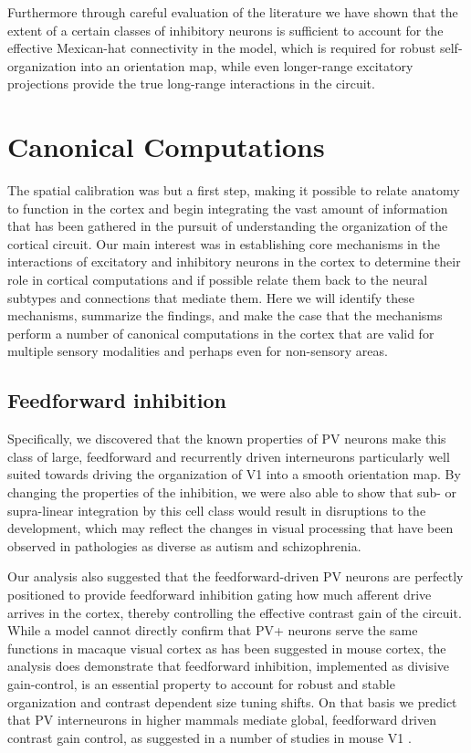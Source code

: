 Furthermore through careful evaluation of the literature we have shown
that the extent of a certain classes of inhibitory neurons is
sufficient to account for the effective Mexican-hat connectivity in
the model, which is required for robust self-organization into an
orientation map, while even longer-range excitatory projections
provide the true long-range interactions in the circuit.

\section{Canonical Computations}

The spatial calibration was but a first step, making it
possible to relate anatomy to function in the cortex and begin
integrating the vast amount of information that has been gathered in
the pursuit of understanding the organization of the cortical
circuit. Our main interest was in establishing core mechanisms in the
interactions of excitatory and inhibitory neurons in the cortex to
determine their role in cortical computations and if possible relate
them back to the neural subtypes and connections that mediate
them. Here we will identify these mechanisms, summarize the findings,
and make the case that the mechanisms perform a number of canonical computations
in the cortex that are valid for multiple sensory modalities and perhaps even
for non-sensory areas.

\subsection{Feedforward inhibition}

Specifically, we discovered that the known properties of PV neurons
make this class of large, feedforward and recurrently driven
interneurons particularly well suited towards driving the organization
of V1 into a smooth orientation map. By changing the properties of the
inhibition, we were also able to show that sub- or supra-linear
integration by this cell class would result in disruptions to the
development, which may reflect the changes in visual processing that
have been observed in pathologies as diverse as autism and
schizophrenia.

Our analysis also suggested that the feedforward-driven PV neurons are
perfectly positioned to provide feedforward inhibition gating how much
afferent drive arrives in the cortex, thereby controlling the effective
contrast gain of the circuit. While a model cannot directly confirm
that PV+ neurons serve the same functions in macaque visual cortex as
has been suggested in mouse cortex, the analysis does demonstrate that
feedforward inhibition, implemented as divisive gain-control, is an
essential property to account for robust and stable organization and
contrast dependent size tuning shifts. On that basis we predict that
PV interneurons in higher mammals mediate global, feedforward driven
contrast gain control, as suggested in a number of studies in mouse V1
\citep{Ma2010, Atallah2012, Wilson2012, Nienborg2013}.

